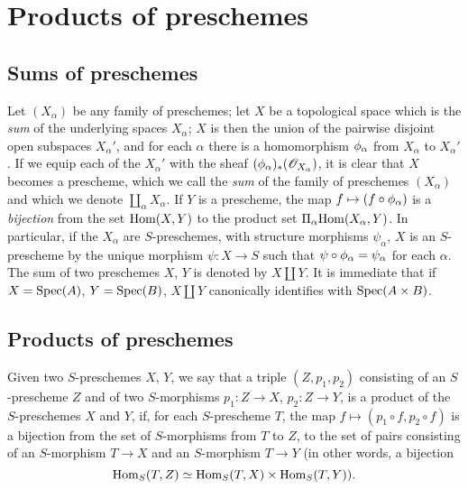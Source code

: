 \section{Products of preschemes}
\label{section-products-of-preschemes}

\subsection{Sums of preschemes}
\label{subsection-sums-of-preschemes}

Let $(X_\alpha)$ be any family of preschemes; let $X$ be a topological space which is the
\emph{sum} of the underlying spaces $X_\alpha$; $X$ is then the union of the pairwise
disjoint open subspaces $X_\alpha'$, and for each $\alpha$ there is a homomorphism
$\phi_\alpha$ from $X_\alpha$ to $X_\alpha'$. If we equip each of the $X_\alpha'$ with the
sheaf $(\phi_\alpha)_*(\mathscr{O}_{X_\alpha})$, it is clear that $X$ becomes a prescheme, which
we call the \emph{sum} of the family of preschemes $(X_\alpha)$ and which we denote
$\amalg_\alpha X_\alpha$. If $Y$ is a prescheme, the map $f\mapsto(f\circ\vphi_\alpha)$ is a
\emph{bijection} from the set ${\mathop{\mathrm{Hom}}\nolimits}(X,Y)$ to the product set $\Pi_\alpha{\mathop{\mathrm{Hom}}\nolimits}(X_\alpha,Y)$.
In particular, if the $X_\alpha$ are $S$-preschemes, with structure morphisms $\psi_\alpha$,
$X$ is an $S$-prescheme by the unique morphism $\psi:X\to S$ such that
$\psi\circ\phi_\alpha=\psi_\alpha$ for each $\alpha$. The sum of two preschemes $X$, $Y$ is
denoted by $X\amalg Y$. It is immediate that if $X={\mathop{\mathrm{Spec}}\nolimits}(A)$, $Y={\mathop{\mathrm{Spec}}\nolimits}(B)$, $X\amalg Y$
canonically identifies with ${\mathop{\mathrm{Spec}}\nolimits}(A\times B)$.

\subsection{Products of preschemes}
\label{subsection-products-of-preschemes}

\begin{defn}[3.2.1]
\label{1.3.2.1}
Given two $S$-preschemes $X$, $Y$, we say that a triple $(Z,p_1,p_2)$ consisting of an
$S$-prescheme $Z$ and of two $S$-morphisms $p_1:Z\to X$, $p_2:Z\to Y$, is a product of the
$S$-preschemes $X$ and $Y$, if, for each $S$-prescheme $T$, the map
$f\mapsto(p_1\circ f,p_2\circ f)$ is a bijection from the set of $S$-morphisms from $T$ to
$Z$, to the set of pairs consisting of an $S$-morphism $T\to X$ and an $S$-morphism $T\to Y$
(in other words, a bijection
\[
  {\mathop{\mathrm{Hom}}\nolimits}_S(T,Z)\simeq{\mathop{\mathrm{Hom}}\nolimits}_S(T,X)\times{\mathop{\mathrm{Hom}}\nolimits}_S(T,Y)).
\]
\end{defn}

